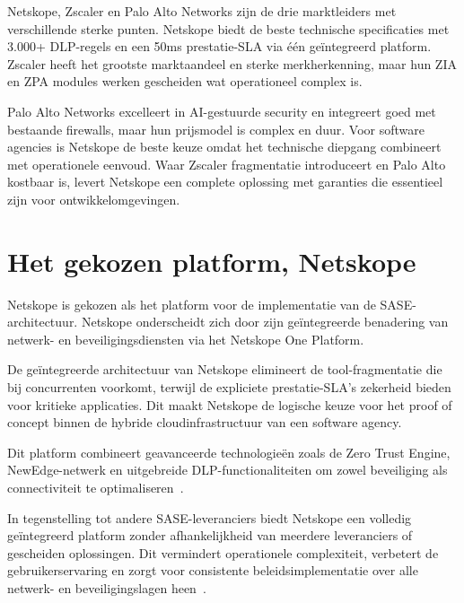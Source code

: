 \vspace{2ex}

Netskope, Zscaler en Palo Alto Networks zijn de drie marktleiders met verschillende sterke punten. Netskope biedt de beste technische specificaties met 3.000+ DLP-regels en een 50ms prestatie-SLA via één geïntegreerd platform. Zscaler heeft het grootste marktaandeel en sterke merkherkenning, maar hun ZIA en ZPA modules werken gescheiden wat operationeel complex is.

Palo Alto Networks excelleert in AI-gestuurde security en integreert goed met bestaande firewalls, maar hun prijsmodel is complex en duur. Voor software agencies is Netskope de beste keuze omdat het technische diepgang combineert met operationele eenvoud. Waar Zscaler fragmentatie introduceert en Palo Alto kostbaar is, levert Netskope een complete oplossing met garanties die essentieel zijn voor ontwikkelomgevingen.

\section{Het gekozen platform, Netskope}
Netskope is gekozen als het platform voor de implementatie van de SASE-architectuur. Netskope onderscheidt zich door zijn geïntegreerde benadering van netwerk- en beveiligingsdiensten via het Netskope One Platform. 

\vspace{2ex}

De geïntegreerde architectuur van Netskope elimineert de tool-fragmentatie die bij concurrenten voorkomt, terwijl de expliciete prestatie-SLA's zekerheid bieden voor kritieke applicaties. Dit maakt Netskope de logische keuze voor het proof of concept binnen de hybride cloudinfrastructuur van een software agency.

\vspace{2ex}

Dit platform combineert geavanceerde technologieën zoals de Zero Trust Engine, NewEdge-netwerk en uitgebreide DLP-functionaliteiten om zowel beveiliging als connectiviteit te optimaliseren~\autocite{Netskope2025-1}.

\vspace{2ex}

In tegenstelling tot andere SASE-leveranciers biedt Netskope een volledig geïntegreerd platform zonder afhankelijkheid van meerdere leveranciers of gescheiden oplossingen. Dit vermindert operationele complexiteit, verbetert de gebruikerservaring en zorgt voor consistente beleidsimplementatie over alle netwerk- en beveiligingslagen heen~\autocite{Netskope2025-1}.

